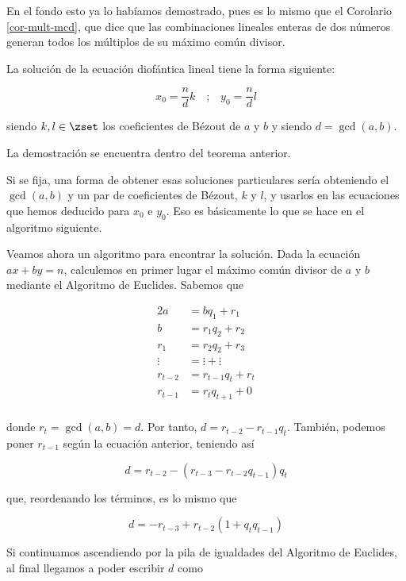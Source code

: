 En el fondo esto ya lo habíamos demostrado, pues es lo mismo que el
Corolario \ref{cor-mult-mcd}, que dice que las combinaciones lineales
enteras de dos números generan todos los múltiplos de su máximo común
divisor.

\begin{theorem}
  La solución de la ecuación diofántica lineal tiene la forma siguiente:

  $$ x_0 = \frac{n}{d}k \quad \text{;} \quad y_0 = \frac{n}{d}l $$

  \noindent siendo $k, l \in \zset$ los coeficientes de Bézout de $a$ y $b$
  y siendo $d = \gcd(a, b)$.
\end{theorem}

La demostración se encuentra dentro del teorema anterior.

\iffalse
Si se fija, una forma de obtener esas soluciones particulares sería
obteniendo el $\gcd(a, b)$ y un par de coeficientes de Bézout, $k$ y $l$, y
usarlos en las ecuaciones que hemos deducido para $x_0$ e $y_0$. Eso es
básicamente lo que se hace en el algoritmo siguiente.

Veamos ahora un algoritmo para encontrar la solución. Dada la ecuación $ax +
by = n$, calculemos en primer lugar el máximo común divisor de $a$ y $b$
mediante el Algoritmo de Euclides. Sabemos que

\begin{alignat*}{2}
  a       &=  bq_1 + r_1 \\
  b       &=  r_1q_2 + r_2 \\
  r_1     &=  r_2q_2 + r_3 \\
  \vdots  &= \vdots + \vdots \\
  r_{t-2} &= r_{t-1}q_t + r_t \\
  r_{t-1} &= r_tq_{t+1} + 0 \\
\end{alignat*}

\noindent donde $r_t = \gcd(a, b) = d$. Por tanto, $d = r_{t-2} -
r_{t-1}q_t$. También, podemos poner $r_{t-1}$ según la ecuación anterior,
teniendo así

$$ d = r_{t-2} - (r_{t-3} - r_{t-2}q_{t-1})q_t $$

\noindent que, reordenando los términos, es lo mismo que

$$ d = {-r_{t-3}} + r_{t-2} (1 + q_tq_{t-1}) $$

Si continuamos ascendiendo por la pila de igualdades del Algoritmo de
Euclides, al final llegamos a poder escribir $d$ como

